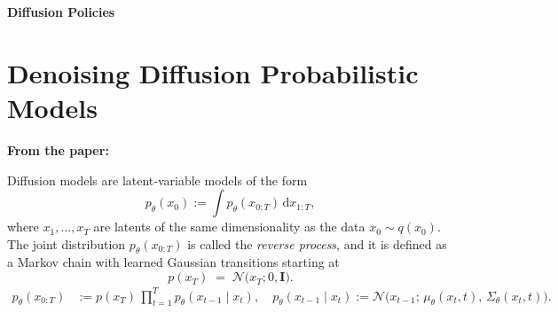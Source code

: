 \documentclass[12pt,a4paper]{article}
\begin{document}
\begin{titlepage}
    \centering
    \vspace*{2cm}
    {\Large\bfseries Diffusion Policies\par}
    \vspace{2cm}
\end{titlepage}

\tableofcontents
\newpage
\section{Denoising Diffusion Probabilistic Models}
\begin{center}
    \large\textbf{From the paper:}
\end{center}
Diffusion models are latent‐variable models of the form
\[
  p_\theta(x_0)
  := \int p_\theta(x_{0:T}) \,\mathrm{d}x_{1:T},
\]
where \(x_1,\dots,x_T\) are latents of the same dimensionality as the data
\(x_0\sim q(x_0)\).  The joint distribution \(p_\theta(x_{0:T})\) is called
the \emph{reverse process}, and it is defined as a Markov chain with learned
Gaussian transitions starting at
\[
  p(x_T) \;=\; \mathcal{N}\bigl(x_T;0,\mathbf I\bigr).
\]
\begin{align}
  p_\theta(x_{0:T})
  &:= p(x_T)\,\prod_{t=1}^T p_\theta(x_{t-1}\mid x_t),
  \quad
  p_\theta(x_{t-1}\mid x_t)
  := \mathcal{N}\!\bigl(x_{t-1};\,\mu_\theta(x_t,t),\,\Sigma_\theta(x_t,t)\bigr).
  \tag{1}\label{eq:reverse}
\end{align}
\end{document}
